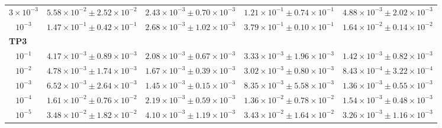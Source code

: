 \begin{table}[ht]
{\begin{tabular}{ccccc}
$3\times10^{-3}$ & $5.58\times10^{-2} \pm 2.52\times10^{-2}$ & $2.43\times10^{-3} \pm 0.70\times10^{-3}$ & $1.21\times10^{-1} \pm 0.74\times10^{-1}$ & $4.88\times10^{-3} \pm 2.02\times10^{-3}$ \\
$10^{-3}$ & $1.47\times10^{-1} \pm 0.42\times10^{-1}$ & $2.68\times10^{-3} \pm 1.02\times10^{-3}$ & $3.79\times10^{-1} \pm 0.10\times10^{-1}$ & $1.64\times10^{-2} \pm 0.14\times10^{-2}$ \\
\hline
\multicolumn{5}{l}{\textbf{TP3}} \\
\hline
$10^{-1}$ & $4.17\times10^{-3} \pm 0.89\times10^{-3}$ & $2.08\times10^{-3} \pm 0.67\times10^{-3}$ & $3.33\times10^{-3} \pm 1.96\times10^{-3}$ & $1.42\times10^{-3} \pm 0.82\times10^{-3}$ \\
$10^{-2}$ & $4.78\times10^{-3} \pm 1.74\times10^{-3}$ & $1.67\times10^{-3} \pm 0.39\times10^{-3}$ & $3.02\times10^{-3} \pm 0.80\times10^{-3}$ & $8.43\times10^{-4} \pm 3.22\times10^{-4}$ \\
$10^{-3}$ & $6.52\times10^{-3} \pm 2.64\times10^{-3}$ & $1.45\times10^{-3} \pm 0.15\times10^{-3}$ & $8.35\times10^{-3} \pm 5.58\times10^{-3}$ & $1.36\times10^{-3} \pm 0.55\times10^{-3}$ \\
$10^{-4}$ & $1.61\times10^{-2} \pm 0.76\times10^{-2}$ & $2.19\times10^{-3} \pm 0.59\times10^{-3}$ & $1.36\times10^{-2} \pm 0.78\times10^{-2}$ & $1.54\times10^{-3} \pm 0.48\times10^{-3}$ \\
$10^{-5}$ & $3.48\times10^{-2} \pm 1.82\times10^{-2}$ & $4.10\times10^{-3} \pm 1.19\times10^{-3}$ & $3.43\times10^{-2} \pm 1.64\times10^{-2}$ & $3.26\times10^{-3} \pm 1.16\times10^{-3}$ \\
\hline
\end{tabular}%
}
\end{table}

